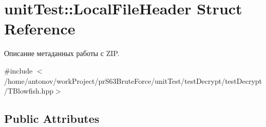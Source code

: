 \hypertarget{structunit_test_1_1_local_file_header}{}\section{unit\+Test\+:\+:Local\+File\+Header Struct Reference}
\label{structunit_test_1_1_local_file_header}


Описание метаданных работы с Z\+IP.  




{\ttfamily \#include $<$/home/antonov/work\+Project/pr\+S63\+Brute\+Force/unit\+Test/test\+Decrypt/test\+Decrypt/\+T\+Blowfish.\+hpp$>$}

\subsection*{Public Attributes}
